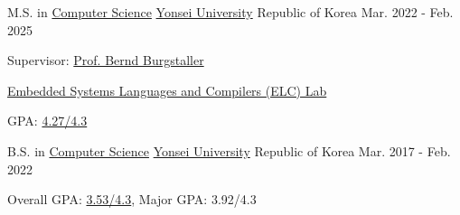

\begin{cventries}

  \cventry
    {M.S. in \href{https://cs.yonsei.ac.kr/index.php}{Computer Science}} %
    {\href{https://www.yonsei.ac.kr/sc/index.jsp}{Yonsei University}} %
    {Republic of Korea} %
    {Mar. 2022 - Feb. 2025} %
    {
      \begin{cvitems} %
        \item {Supervisor: \href{https://cs.yonsei.ac.kr/bbs/board.php?bo_table=sub2_1_a&wr_id=18}{Prof. Bernd Burgstaller}}
        \item {\href{https://elc.yonsei.ac.kr}{Embedded Systems Languages and Compilers (ELC) Lab}}
        \item {GPA: \href{https://drive.google.com/file/d/1p5EAixYWCerQ1rd1fb-1V0mppF3Dal0N/view?usp=sharing}{4.27/4.3}}
      \end{cvitems}
    }

  \cventry
    {B.S. in \href{https://cs.yonsei.ac.kr/index.php}{Computer Science}} %
    {\href{https://www.yonsei.ac.kr/sc/index.jsp}{Yonsei University}} %
    {Republic of Korea} %
    {Mar. 2017 - Feb. 2022} %
    {
      \begin{cvitems} %
        \item {Overall GPA: \href{https://drive.google.com/file/d/1g-O5m43w4wgwSG9iAbFg4uPoqe1EhkWh/view?usp=sharing}{3.53/4.3}, Major GPA: 3.92/4.3}
      \end{cvitems}
    }
\end{cventries}
